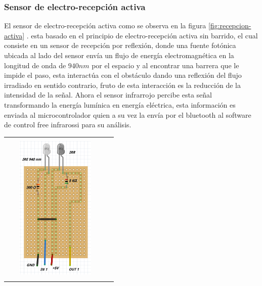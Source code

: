 \documentclass[12]{article}
\newenvironment{Figure}
{\par\medskip\noindent\minipage{\linewidth}}
{\endminipage\par\medskip}
\begin{document}
\begin{multicols}{2}
\subsubsection{Sensor de electro-recepción activa}
El sensor de electro-recepción activa como se observa en la figura \ref{fig:recepcion-activa} . esta basado en el principio de electro-recepción activa sin barrido, el cual consiste en un sensor de recepción por reflexión, donde una fuente fotónica ubicada al lado del sensor 	envía un flujo de energía electromagnética en la longitud de onda de $940 nm$ por el espacio y al encontrar una  barrera que le impide el paso, esta interactúa con el obstáculo dando una reflexión del flujo irradiado en sentido contrario, fruto de esta interacción es la reducción de la intensidad de la señal. Ahora el sensor infrarrojo percibe esta señal transformando la energía lumínica en energía eléctrica, esta información es enviada al microcontrolador quien a su vez la envía por el bluetooth al software de control free infrarossi para su análisis. 
\begin{Figure}
\center
\begin{tabular}{|l|r|}
\hline
\\
\includegraphics[width=5cm, height=7cm]{img/F4.png}  \\\\ \hline
\end{tabular}
\label{fig:Elec_Act}
\end{Figure}

\end{multicols}
\end{document}
